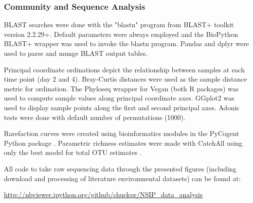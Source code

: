 \subsubsection{Community and Sequence Analysis}
BLAST searches were done with the "blastn" program from BLAST+ toolkit
\citep{20003500} version 2.2.29+. Default parameters were always employed and
the BioPython \citep{19304878} BLAST+ wrapper was used to invoke the blastn
program. Pandas \citep{citeulike:11241428} and dplyr \citep{dplyr} were used to
parse and munge BLAST output tables.  

Principal coordinate ordinations depict the relationship between
samples at each time point (day 2 and 4). Bray-Curtis distances were
used as the sample distance metric for ordination. The Phyloseq
\citep{24699258} wrapper for Vegan \citep{vegan} (both R packages) was
used to compute sample values along principal coordinate axes. GGplot2
\citep{ggplot2} was used to display sample points along the first and
second principal axes. Adonis tests \cite{Anderson_2001} were done with default
number of permutations (1000).

Rarefaction curves were created using
bioinformatics modules in the PyCogent Python package \citep{Knight_2007}.
Parametric richness estimates were made with CatchAll using only the best model
for total OTU estimates \citep{BUNGE_2010}.

All code to take raw sequencing data through the presented figures (including
download and processing of literature environmental datasets) can be
found at:

\url{http://nbviewer.ipython.org/github/chuckpr/NSIP_data_analysis}